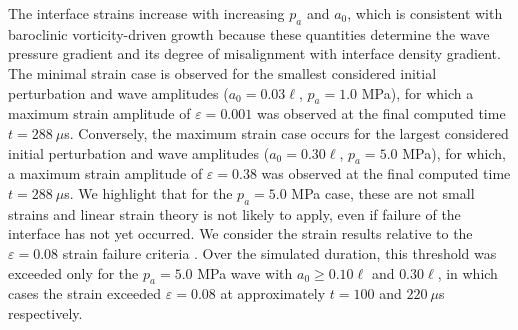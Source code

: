 The interface strains increase with increasing $p_a$ and $a_0$, which
is consistent with baroclinic vorticity-driven growth because these
quantities determine the wave pressure gradient and its degree of
misalignment with interface density gradient. The minimal strain case
is observed for the smallest considered initial perturbation and wave
amplitudes ($a_0 = 0.03\ell$, $p_a = 1.0$ MPa), for which a maximum
strain amplitude of $\varepsilon=0.001$ was observed at the final
computed time $t = 288~\mu$s. Conversely, the maximum strain case
occurs for the largest considered initial perturbation and wave
amplitudes ($a_0 = 0.30\ell$, $p_a = 5.0$ MPa), for which, a maximum
strain amplitude of $\varepsilon=0.38$ was observed at the final
computed time $t = 288 ~\mu$s. We highlight that for the $p_a=5.0$ MPa
case, these are not small strains and linear strain theory is not
likely to apply, even if failure of the interface has not yet
occurred. We consider the strain results relative to the
$\varepsilon=0.08$ strain failure criteria \citep{Belete2010}. Over
the simulated duration, this threshold was exceeded only for the
$p_a = 5.0$ MPa wave with $a_0 \geq 0.10\ell$ and $0.30\ell$, in which
cases the strain exceeded $\varepsilon=0.08$ at approximately $t=100$
and $220~\mu$s respectively.
% 
